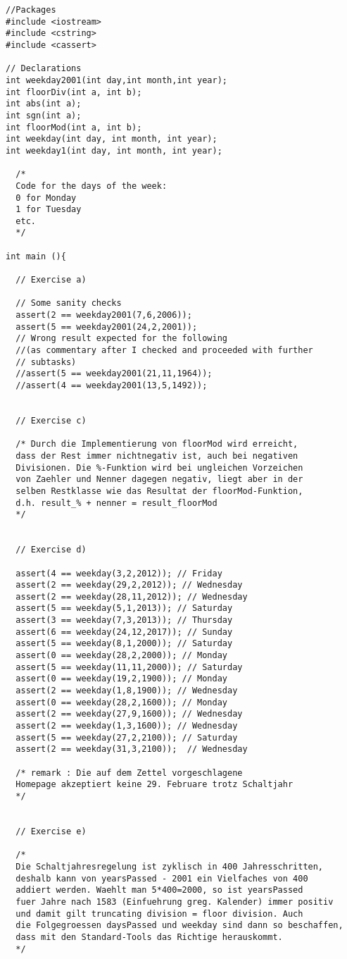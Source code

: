 \begin{lstlisting}
//Packages
#include <iostream>
#include <cstring>
#include <cassert>

// Declarations
int weekday2001(int day,int month,int year);
int floorDiv(int a, int b);
int abs(int a);
int sgn(int a);
int floorMod(int a, int b);
int weekday(int day, int month, int year);
int weekday1(int day, int month, int year);

  /*
  Code for the days of the week:
  0 for Monday
  1 for Tuesday
  etc.
  */

int main (){

  // Exercise a)

  // Some sanity checks
  assert(2 == weekday2001(7,6,2006));
  assert(5 == weekday2001(24,2,2001));
  // Wrong result expected for the following 
  //(as commentary after I checked and proceeded with further
  // subtasks)
  //assert(5 == weekday2001(21,11,1964));
  //assert(4 == weekday2001(13,5,1492));
  

  // Exercise c)

  /* Durch die Implementierung von floorMod wird erreicht,
  dass der Rest immer nichtnegativ ist, auch bei negativen
  Divisionen. Die %-Funktion wird bei ungleichen Vorzeichen
  von Zaehler und Nenner dagegen negativ, liegt aber in der
  selben Restklasse wie das Resultat der floorMod-Funktion,
  d.h. result_% + nenner = result_floorMod
  */  


  // Exercise d)

  assert(4 == weekday(3,2,2012)); // Friday
  assert(2 == weekday(29,2,2012)); // Wednesday
  assert(2 == weekday(28,11,2012)); // Wednesday
  assert(5 == weekday(5,1,2013)); // Saturday
  assert(3 == weekday(7,3,2013)); // Thursday
  assert(6 == weekday(24,12,2017)); // Sunday
  assert(5 == weekday(8,1,2000)); // Saturday
  assert(0 == weekday(28,2,2000)); // Monday  
  assert(5 == weekday(11,11,2000)); // Saturday
  assert(0 == weekday(19,2,1900)); // Monday
  assert(2 == weekday(1,8,1900)); // Wednesday
  assert(0 == weekday(28,2,1600)); // Monday
  assert(2 == weekday(27,9,1600)); // Wednesday
  assert(2 == weekday(1,3,1600)); // Wednesday
  assert(5 == weekday(27,2,2100)); // Saturday
  assert(2 == weekday(31,3,2100));  // Wednesday

  /* remark : Die auf dem Zettel vorgeschlagene 
  Homepage akzeptiert keine 29. Februare trotz Schaltjahr
  */


  // Exercise e)

  /*
  Die Schaltjahresregelung ist zyklisch in 400 Jahresschritten,
  deshalb kann von yearsPassed - 2001 ein Vielfaches von 400
  addiert werden. Waehlt man 5*400=2000, so ist yearsPassed
  fuer Jahre nach 1583 (Einfuehrung greg. Kalender) immer positiv
  und damit gilt truncating division = floor division. Auch
  die Folgegroessen daysPassed und weekday sind dann so beschaffen,
  dass mit den Standard-Tools das Richtige herauskommt.
  */


\end{lstlisting}
